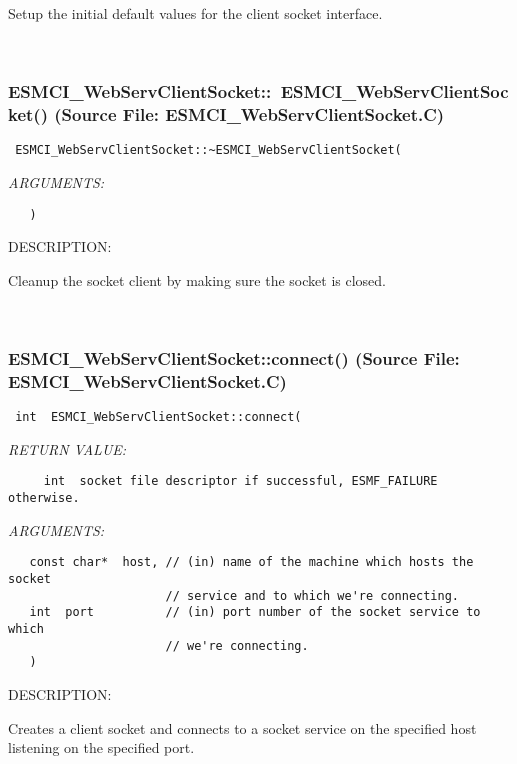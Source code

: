       Setup the initial default values for the client socket interface.
   
 
\mbox{}\hrulefill\
 
\subsubsection{ESMCI\_WebServClientSocket::~ESMCI\_WebServClientSocket() (Source File: ESMCI\_WebServClientSocket.C)}


  
\begin{verbatim} ESMCI_WebServClientSocket::~ESMCI_WebServClientSocket(\end{verbatim}{\em ARGUMENTS:}
\begin{verbatim}   )\end{verbatim}
{\sf DESCRIPTION:\\ }


      Cleanup the socket client by making sure the socket is closed.
   
 
\mbox{}\hrulefill\
 
\subsubsection{ESMCI\_WebServClientSocket::connect() (Source File: ESMCI\_WebServClientSocket.C)}


  
\begin{verbatim} int  ESMCI_WebServClientSocket::connect(\end{verbatim}{\em RETURN VALUE:}
\begin{verbatim}     int  socket file descriptor if successful, ESMF_FAILURE otherwise.\end{verbatim}{\em ARGUMENTS:}
\begin{verbatim}   const char*  host, // (in) name of the machine which hosts the socket
                      // service and to which we're connecting.
   int  port          // (in) port number of the socket service to which
                      // we're connecting.
   )\end{verbatim}
{\sf DESCRIPTION:\\ }


      Creates a client socket and connects to a socket service on the
      specified host listening on the specified port.
  
\setlength{\parskip}{\oldparskip}
\setlength{\parindent}{\oldparindent}
\setlength{\baselineskip}{\oldbaselineskip}
